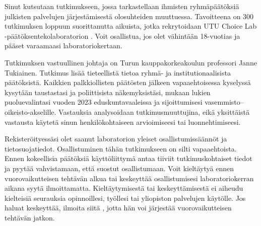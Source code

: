 
\renewcommand{\StudyTitle}{\StudyTitleFI}
\setlength{\emergencystretch}{8em}


Sinut kutsutaan tutkimukseen, jossa tarkastellaan ihmisten ryhmäpäätöksiä julkisten palvelujen järjestämisestä olosuhteiden muuttuessa. Tavoitteena on 300 tutkimuksen loppuun suorittanutta aikuista, jotka rekrytoidaan UTU Choice Lab -päätöksentekolaboratorion .  Voit osallistua, jos olet vähintään 18-vuotias ja pääset varaamaasi laboratoriokertaan.

Tutkimuksen vastuullinen johtaja on Turun kauppakorkeakoulun professori Janne Tukiainen. Tutkimus lisää tieteellistä tietoa ryhmä- ja institutionaalisista päätöksistä. Kaikkien palkkiollisten päätösten jälkeen vapaaehtoisessa kyselyssä kysytään taustastasi ja poliittisista näkemyksistäsi, mukaan lukien puoluevalintasi vuoden 2023 eduskuntavaaleissa ja sijoittumisesi vasemmisto--oikeisto-akselille. Vastauksia analysoidaan tutkimusmuuttujina, eikä yksittäistä vastausta käytetä sinun henkilökohtaiseen arvioimiseesi tai luonnehtimiseesi.

Rekisteröityessäsi  olet saanut laboratorion yleiset osallistumissäännöt ja tietosuojatiedot. Osallistuminen tähän tutkimukseen on silti vapaaehtoista. Ennen kokeellisia päätöksiä käyttöliittymä antaa tiiviit tutkimuskohtaiset tiedot ja pyytää vahvistamaan, että suostut osallistumaan.  Voit kieltäytyä ennen vuorovaikutteisen tehtävän alkua tai keskeyttää osallistumisesi laboratoriokerran aikana syytä ilmoittamatta. Kieltäytymisestä tai keskeyttämisestä ei aiheudu kielteisiä seurauksia opinnoillesi, työllesi tai yliopiston palvelujen käytölle. Jos haluat keskeyttää, ilmoita siitä , jotta hän voi järjestää vuorovaikutteisen tehtävän jatkon.

